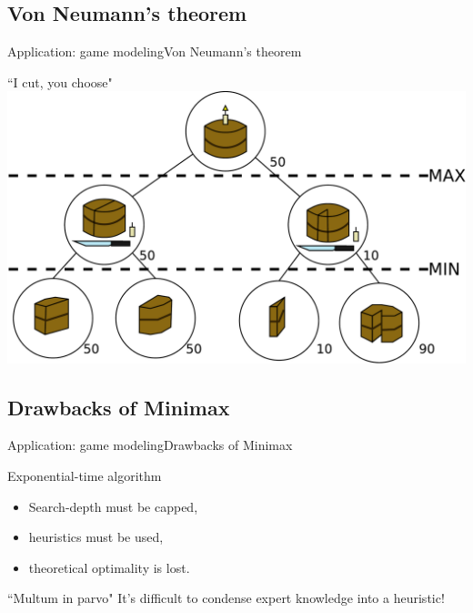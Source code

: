 \subsection{Von Neumann's theorem}
\begin{frame}{Application: game modeling}{Von Neumann's theorem}
\begin{block}{``I cut, you choose"}
\centering
\includegraphics[height=0.6\paperheight]{img/application/cakes.pdf}
\end{block}
\end{frame}

\subsection{Drawbacks of Minimax}
\begin{frame}{Application: game modeling}{Drawbacks of Minimax}

\begin{block}{Exponential-time algorithm}
\begin{itemize}
\item Search-depth must be capped,
\item heuristics must be used,
\item theoretical optimality is lost.
\end{itemize}
\end{block}

\begin{block}{``Multum in parvo"}
It's difficult to condense expert knowledge into a heuristic!
\end{block}

\end{frame}

